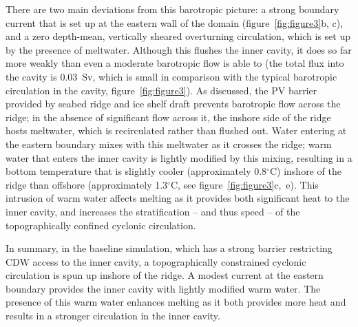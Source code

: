 \documentclass[draft]{agujournal2019}
\begin{document}
There are two main deviations from this barotropic picture: a strong boundary current that is set up at the eastern wall of the domain (figure~\ref{fig:figure3}b, c), and a zero depth-mean, vertically sheared overturning circulation, which is set up by the presence of meltwater. Although this flushes the inner cavity, it does so far more weakly than even a moderate barotropic flow is able to (the total flux into the cavity is 0.03~Sv, which is small in comparison with the typical barotropic circulation in the cavity, figure~\ref{fig:figure3}). As discussed, the PV barrier provided by seabed ridge and ice shelf draft prevents barotropic flow across the ridge; in the absence of significant flow across it, the inshore side of the ridge hosts meltwater, which is recirculated rather than flushed out. Water entering at the eastern boundary mixes with this meltwater as it crosses the ridge; warm water that enters the inner cavity is lightly modified by this mixing, resulting in a bottom temperature that is slightly cooler (approximately 0.8${}^\circ$C) inshore of the ridge than offshore (approximately 1.3${}^\circ$C, see figure~\ref{fig:figure3}c,~e). This intrusion of warm water affects melting as it provides both significant heat to the inner cavity, and increases the stratification -- and thus speed -- of the topographically confined cyclonic circulation.

In summary, in the baseline simulation, which has a strong barrier restricting CDW access to the inner cavity, a topographically constrained cyclonic circulation is spun up inshore of the ridge. A modest current at the eastern boundary provides the inner cavity with lightly modified warm water. The presence of this warm water enhances melting as it both provides more heat and results in a stronger circulation in the inner cavity.


\end{document}
